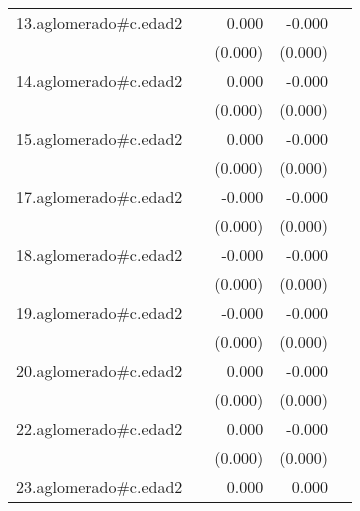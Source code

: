 {\begin{longtable}{l*{4}{D{.}{.}{-1}}}
\addlinespace
13.aglomerado#c.edad2&                     &       0.000         &      -0.000\sym{*}  &                     \\
            &                     &     (0.000)         &     (0.000)         &                     \\
\addlinespace
14.aglomerado#c.edad2&                     &       0.000         &      -0.000         &                     \\
            &                     &     (0.000)         &     (0.000)         &                     \\
\addlinespace
15.aglomerado#c.edad2&                     &       0.000         &      -0.000         &                     \\
            &                     &     (0.000)         &     (0.000)         &                     \\
\addlinespace
17.aglomerado#c.edad2&                     &      -0.000         &      -0.000\sym{*}  &                     \\
            &                     &     (0.000)         &     (0.000)         &                     \\
\addlinespace
18.aglomerado#c.edad2&                     &      -0.000         &      -0.000         &                     \\
            &                     &     (0.000)         &     (0.000)         &                     \\
\addlinespace
19.aglomerado#c.edad2&                     &      -0.000         &      -0.000\sym{**} &                     \\
            &                     &     (0.000)         &     (0.000)         &                     \\
\addlinespace
20.aglomerado#c.edad2&                     &       0.000         &      -0.000         &                     \\
            &                     &     (0.000)         &     (0.000)         &                     \\
\addlinespace
22.aglomerado#c.edad2&                     &       0.000         &      -0.000         &                     \\
            &                     &     (0.000)         &     (0.000)         &                     \\
\addlinespace
23.aglomerado#c.edad2&                     &       0.000\sym{*}  &       0.000         &                     \\

\end{longtable}}
